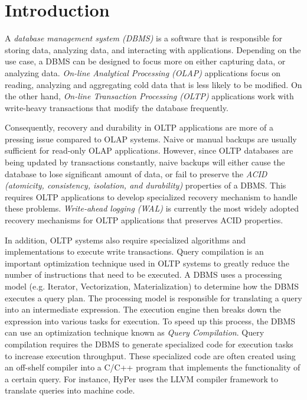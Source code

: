 \documentclass[12pt]{cmuthesis}
\begin{document}
\chapter{Introduction}
A \textit{database management system (DBMS)} is a software that is responsible for storing data, analyzing data, and interacting with applications. Depending on the use case, a DBMS can be designed to focus more on either capturing data, or analyzing data. \textit{On-line Analytical Processing (OLAP)} applications focus on reading, analyzing and aggregating cold data that is less likely to be modified. On the other hand, \textit{On-line Transaction Processing (OLTP)} applications work with write-heavy transactions that modify the database frequently.

Consequently, recovery and durability in OLTP applications are more of a pressing issue compared to OLAP systems. Naive or manual backups are usually sufficient for read-only OLAP applications. However, since OLTP databases are being updated by transactions constantly, naive backups will either cause the database to lose significant amount of data, or fail to preserve the \textit{ACID (atomicity, consistency, isolation, and durability)} properties of a DBMS. This requires OLTP applications to develop specialized recovery mechanism to handle these problems. \textit{Write-ahead logging (WAL)} is currently the most widely adopted recovery mechanisms for OLTP applications that preserves ACID properties.

In addition, OLTP systems also require specialized algorithms and implementations to execute write transactions. Query compilation is an important optimization technique used in OLTP systems to greatly reduce the number of instructions that need to be executed. A DBMS uses a processing model (e.g. Iterator, Vectorization, Materialization) to determine how the DBMS executes a query plan. The processing model is responsible for translating a query into an intermediate expression. The execution engine then breaks down the expression into various tasks for execution. To speed up this process, the DBMS can use an optimization technique known as \textit{Query Compilation}. Query compilation requires the DBMS to generate specialized code for execution tasks to increase execution throughput. These specialized code are often created using an off-shelf compiler into a C/C++ program that implements the functionality of a certain query. For instance, HyPer \cite{hyper_llvm} uses the LLVM compiler framework to translate queries into machine code.
\end{document}
